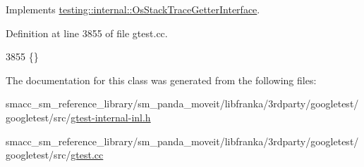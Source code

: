 Implements \hyperlink{classtesting_1_1internal_1_1OsStackTraceGetterInterface_a791bd120428b5a53d5eeba1b27296a39}{testing\+::internal\+::\+Os\+Stack\+Trace\+Getter\+Interface}.



Definition at line 3855 of file gtest.\+cc.


\begin{DoxyCode}
3855 \{\}
\end{DoxyCode}


The documentation for this class was generated from the following files\+:\begin{DoxyCompactItemize}
\item 
smacc\+\_\+sm\+\_\+reference\+\_\+library/sm\+\_\+panda\+\_\+moveit/libfranka/3rdparty/googletest/googletest/src/\hyperlink{gtest-internal-inl_8h}{gtest-\/internal-\/inl.\+h}\item 
smacc\+\_\+sm\+\_\+reference\+\_\+library/sm\+\_\+panda\+\_\+moveit/libfranka/3rdparty/googletest/googletest/src/\hyperlink{gtest_8cc}{gtest.\+cc}\end{DoxyCompactItemize}
